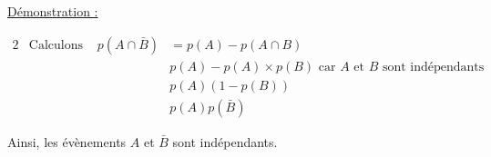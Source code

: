 \documentclass[11pt,a4paper]{article}
\begin{document}
\underline{Démonstration :}

\begin{alignat*}{2}
   & \text{Calculons } & p(A\cap \bar B ) & = p(A)-p(A\cap B)                                             \\
   &                   &                  & p(A)-p(A)\times p(B) \text{ car $A$ et $B$ sont indépendants} \\
   &                   &                  & p(A)(1-p(B))                                                  \\
   &                   &                  & p(A)p(\bar B)
\end{alignat*}

Ainsi, les évènements $A$ et $\bar B$ sont indépendants.
\end{document}
